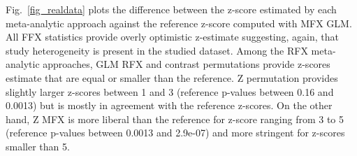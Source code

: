 \documentclass[preprint]{elsarticle}
\begin{document}
Fig.~\ref{fig_realdata} plots the difference between the z-score estimated by each meta-analytic approach against the reference z-score computed with MFX GLM. All FFX statistics provide overly optimistic z-estimate suggesting, again, that study heterogeneity is present in the studied dataset.
Among the RFX meta-analytic approaches, GLM RFX and contrast permutations provide z-scores estimate that are equal or smaller than the reference. Z permutation provides slightly larger z-scores between 1 and 3 (reference p-values between 0.16 and 0.0013) but is mostly in agreement with the reference z-scores. On the other hand, Z MFX is more liberal than the reference for z-score ranging from 3 to 5 (reference p-values between 0.0013 and 2.9e-07) and more stringent for z-scores smaller than 5.



\end{document}
